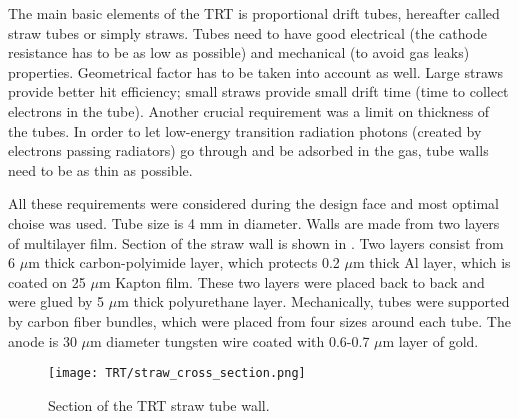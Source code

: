 The main basic elements of the TRT is proportional drift tubes, hereafter called straw tubes or simply straws.
Tubes need to have good electrical (the cathode resistance has to be as low as possible) and mechanical (to avoid gas leaks) properties.
Geometrical factor has to be taken into account as well. Large straws provide better hit efficiency; small straws provide small drift time (time to collect electrons in the tube).
Another crucial requirement was a limit on thickness of the tubes. 
In order to let low-energy transition radiation photons (created by electrons passing radiators) go through and be adsorbed in the gas, tube walls need to be as thin as possible.

All these requirements were considered during the design face and most optimal choise was used.
Tube size is 4 mm in diameter. Walls are made from two layers of multilayer film. Section of the straw wall is shown in .
Two layers consist from 6 $\mu$m thick carbon-polyimide layer, which protects 0.2 $\mu$m thick Al layer, which is coated on 25 $\mu$m Kapton film.
These two layers were placed back to back and were glued by 5 $\mu$m thick polyurethane layer.
Mechanically, tubes were supported by carbon fiber bundles, which were placed from four sizes around each tube.
The anode is 30 $\mu$m diameter tungsten wire coated with 0.6-0.7 $\mu$m layer of gold.

\begin{figure}
\centering
\texttt{[image: TRT/straw\_cross\_section.png]}
\caption{ 
Section of the TRT straw tube wall.
}
\label{fig:straw_wall_section}
\end{figure}


